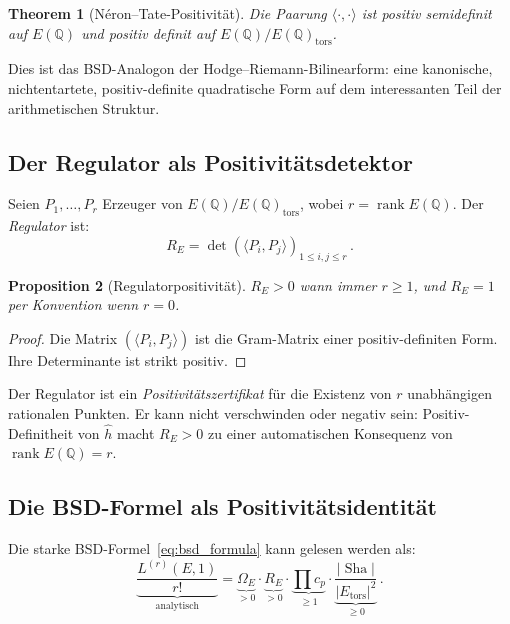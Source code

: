 \documentclass[aps,prd,twocolumn,superscriptaddress,nofootinbib,floatfix]{revtex4-2}
\newtheorem{theorem}{Theorem}[section]
\newtheorem{proposition}[theorem]{Proposition}
\theoremstyle{definition}
\theoremstyle{remark}
\DeclareMathOperator{\rank}{rank}
\DeclareMathOperator{\Sha}{Sha}
\begin{document}
\begin{theorem}[Néron--Tate-Positivität]
\label{thm:NT_positive}
Die Paarung $\langle \cdot, \cdot \rangle$ ist positiv semidefinit auf $E(\mathbb{Q})$ und positiv definit auf $E(\mathbb{Q})/E(\mathbb{Q})_{\mathrm{tors}}$.
\end{theorem}

Dies ist das BSD-Analogon der Hodge--Riemann-Bilinearform: eine kanonische, nichtentartete, positiv-definite quadratische Form auf dem \glqq interessanten\grqq{} Teil der arithmetischen Struktur.

\subsection{Der Regulator als Positivitätsdetektor}

Seien $P_1, \ldots, P_r$ Erzeuger von $E(\mathbb{Q})/E(\mathbb{Q})_{\mathrm{tors}}$, wobei $r = \rank E(\mathbb{Q})$. Der \textit{Regulator} ist:
\begin{equation}
R_E = \det\!\left(\langle P_i, P_j \rangle\right)_{1 \leq i,j \leq r}\,.
\label{eq:regulator}
\end{equation}

\begin{proposition}[Regulatorpositivität]
\label{prop:reg_positive}
$R_E > 0$ wann immer $r \geq 1$, und $R_E = 1$ per Konvention wenn $r = 0$.
\end{proposition}

\begin{proof}
Die Matrix $(\langle P_i, P_j \rangle)$ ist die Gram-Matrix einer positiv-definiten Form. Ihre Determinante ist strikt positiv.
\end{proof}

Der Regulator ist ein \textit{Positivitätszertifikat} für die Existenz von $r$ unabhängigen rationalen Punkten. Er kann nicht verschwinden oder negativ sein: Positiv-Definitheit von $\hat{h}$ macht $R_E > 0$ zu einer automatischen Konsequenz von $\rank E(\mathbb{Q}) = r$.

\subsection{Die BSD-Formel als Positivitätsidentität}

Die starke BSD-Formel~\eqref{eq:bsd_formula} kann gelesen werden als:
\begin{equation}
\underbrace{\frac{L^{(r)}(E,1)}{r!}}_{\text{analytisch}} = \underbrace{\Omega_E}_{> 0} \cdot \underbrace{R_E}_{> 0} \cdot \underbrace{\prod c_p}_{\geq 1} \cdot \underbrace{\frac{|\Sha|}{|E_{\mathrm{tors}}|^2}}_{\geq 0}\,.
\label{eq:bsd_positivity}
\end{equation}
\end{document}
